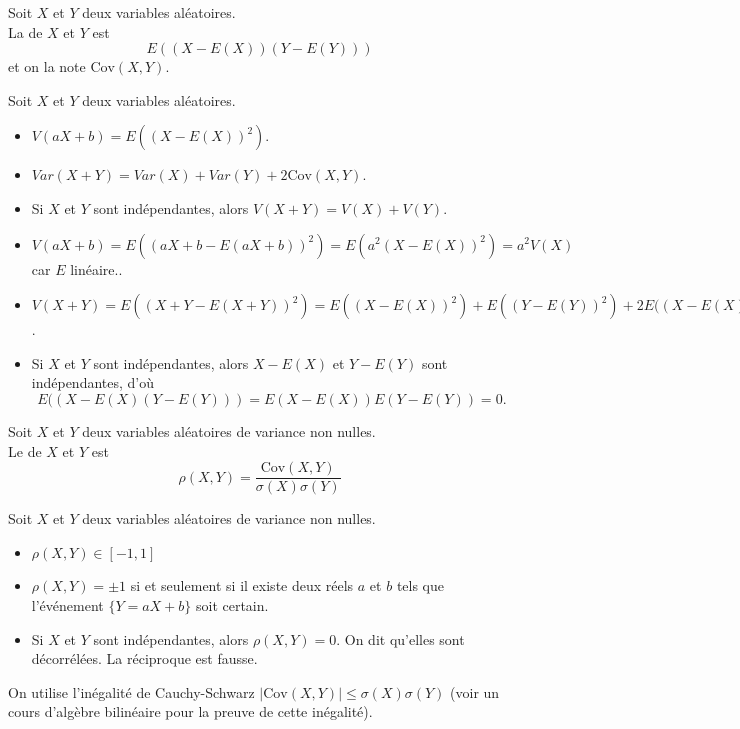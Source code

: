 \documentclass{book}
\begin{document}
\begin{Definition}
Soit $X$ et $Y$ deux variables aléatoires.\\
La  de $X$ et $Y$ est $$E( (X-E(X)) (Y-E(Y)) )$$ et on la note $\mathrm{Cov}(X,Y)$.
\end{Definition}
\begin{Proposition}[Propriétés]
Soit $X$ et $Y$ deux variables aléatoires.
\begin{itemize}
\item
  $V(aX+b) =E\left( (X-E(X))^2\right)$.
  \item
  $Var(X+Y) = Var(X) + Var(Y) + 2\mathrm{Cov}(X,Y)$.
\item
  Si $X$ et $Y$ sont indépendantes, alors $V(X+Y) =V(X)+V(Y)$.
\end{itemize}
\end{Proposition}
\begin{Demonstration}
\begin{itemize}
\item
  $V(aX+b) =E( (aX+b-E(aX+b))^2)=E( a^2(X-E(X))^2)=a^2V(X)$ car $E$ linéaire..
\item
   $V(X+Y) =E( (X+Y-E(X+Y))^2)= E( (X-E(X))^2) +  E( (Y-E(Y))^2)+2E( (X-E(X)(Y-E(Y))) =Var(X) + Var(Y) + 2\mathrm{Cov}(X,Y)$.
\item
Si $X$ et $Y$ sont indépendantes, alors $X-E(X)$ et $Y-E(Y)$ sont indépendantes, d'où $$E( (X-E(X)(Y-E(Y)))=E(X-E(X)) E(Y-E(Y))=0.$$
\end{itemize}
\end{Demonstration}


\begin{Definition}[Corrélation]
Soit $X$ et $Y$ deux variables aléatoires de variance non nulles.\\
Le  de $X$ et $Y$ est
\[ \rho(X,Y) = \frac{\mathrm{Cov}(X,Y)}{\sigma(X)\sigma(Y)} \]
\end{Definition}
\begin{Proposition}[Propriétés]
Soit $X$ et $Y$ deux variables aléatoires de variance non nulles.
\begin{itemize}
\item
  $\rho(X,Y) \in [-1,1]$
\item
  $\rho(X,Y) = ±1$ si et seulement si il existe deux réels $a$ et $b$ tels que l'événement $\{Y=aX+b\}$ soit certain.
\item
  Si $X$ et $Y$ sont indépendantes, alors $\rho(X,Y) = 0$. On dit qu'elles sont décorrélées.
  La réciproque est fausse.
\end{itemize}
\end{Proposition}
\begin{Demonstration}
On utilise l'inégalité de Cauchy-Schwarz $|\mathrm{Cov}(X, Y )| \leq \sigma (X)\sigma (Y )$ (voir un cours d'algèbre bilinéaire pour la preuve de cette inégalité).
\end{Demonstration}
\end{document}
